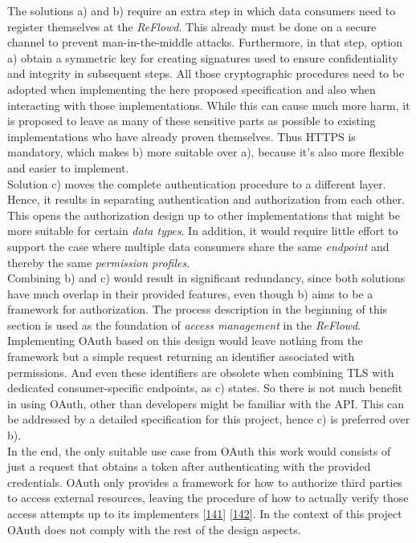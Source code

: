 \documentclass[12pt,english,a4paper,titlepage,cleardoublepage=empty,dottedtoc]{report}
\begin{document}
The solutions a) and b) require an extra step in which data consumers
need to register themselves at the \emph{ReFlowd}. This already must be
done on a secure channel to prevent man-in-the-middle attacks.
Furthermore, in that step, option a) obtain a symmetric key for creating
signatures used to ensure confidentiality and integrity in subsequent
steps. All those cryptographic procedures need to be adopted when
implementing the here proposed specification and also when interacting
with those implementations. While this can cause much more harm, it is
proposed to leave as many of these sensitive parts as possible to
existing implementations who have already proven themselves. Thus HTTPS
is mandatory, which makes b) more suitable over a), because it's also
more flexible and easier to implement.\\
Solution c) moves the complete authentication procedure to a different
layer. Hence, it results in separating authentication and authorization
from each other. This opens the authorization design up to other
implementations that might be more suitable for certain \emph{data
types}. In addition, it would require little effort to support the case
where multiple data consumers share the same \emph{endpoint} and thereby
the same \emph{permission profiles}.\\
Combining b) and c) would result in significant redundancy, since both
solutions have much overlap in their provided features, even though b)
aims to be a framework for authorization. The process description in the
beginning of this section is used as the foundation of \emph{access
management} in the \emph{ReFlowd}. Implementing OAuth based on this
design would leave nothing from the framework but a simple request
returning an identifier associated with permissions. And even these
identifiers are obsolete when combining TLS with dedicated
consumer-specific endpoints, as c) states. So there is not much benefit
in using OAuth, other than developers might be familiar with the API.
This can be addressed by a detailed specification for this project,
hence c) is preferred over b).\\
In the end, the only suitable use case from OAuth this work would
consists of just a request that obtains a token after authenticating
with the provided credentials. OAuth only provides a framework for how
to authorize third parties to access external resources, leaving the
procedure of how to actually verify those access attempts up to its
implementers
{[}\protect\hyperlink{ref-web_spec_oauth-1a_access-verification}{141}{]}
{[}\protect\hyperlink{ref-web_spec_oauth-2_access-verification}{142}{]}.
In the context of this project OAuth does not comply with the rest of
the design aspects.
\end{document}

